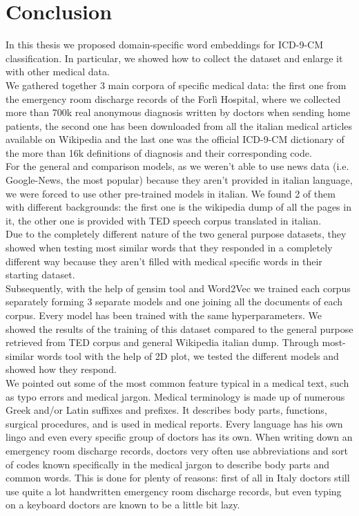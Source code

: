 \chapter{Conclusion}
In this thesis we proposed domain-specific word embeddings for ICD-9-CM classification. In particular, we showed how to collect the dataset and enlarge it with other medical data.\\
We gathered together 3 main corpora of specific medical data: the first one from the emergency room discharge records of the Forlì Hospital, where we collected more than 700k real anonymous diagnosis written by doctors when sending home patients, the second one has been downloaded from all the italian medical articles available on Wikipedia and the last one was the official ICD-9-CM dictionary of the more than 16k definitions of diagnosis and their corresponding code.\\
For the general and comparison models, as we weren't able to use news data (i.e. Google-News, the most popular) because they aren't provided in italian language, we were forced to use other pre-trained models in italian. We found 2 of them with different backgrounds: the first one is the wikipedia dump of all the pages in it, the other one is provided with TED speech corpus translated in italian.\\
Due to the completely different nature of the two general purpose datasets, they showed when testing most similar words that they responded in a completely different way because they aren't filled with medical specific words in their starting dataset.\\
Subsequently, with the help of gensim tool and Word2Vec we trained each corpus separately forming 3 separate models and one joining all the documents of each corpus. Every model has been trained with the same hyperparameters.
We showed the results of the training of this dataset compared to the general purpose retrieved from TED corpus and general Wikipedia italian dump. Through most-similar words tool with the help of 2D plot, we tested the different models and showed how they respond.\\
We pointed out some of the most common feature typical in a medical text, such as typo errors and medical jargon. Medical terminology is made up of numerous Greek and/or Latin suffixes and prefixes. It describes body parts, functions, surgical procedures, and is used in medical reports. Every language has his own lingo and even every specific group of doctors has its own. When writing down an emergency room discharge records, doctors very often use abbreviations and sort of codes known specifically in the medical jargon to describe body parts and common words. This is done for plenty of reasons: first of all in Italy doctors still use quite a lot handwritten emergency room discharge records, but even typing on a keyboard doctors are known to be a little bit lazy.\\
